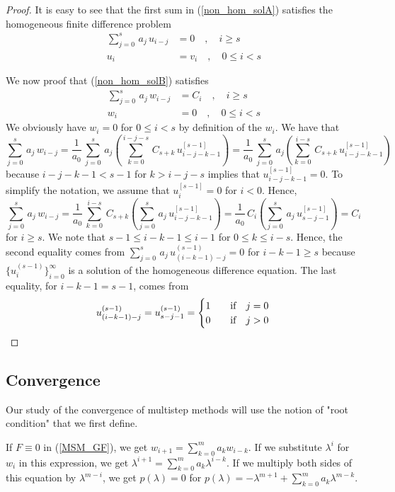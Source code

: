 \begin{proof}
It is easy to see that the first sum in (\ref{non_hom_solA}) satisfies
the homogeneous finite difference problem
\begin{align*}
\sum_{j=0}^s\,a_j\,u_{i-j} &= 0 \quad, \quad i \geq s \\
u_i &= v_i \quad, \quad 0 \leq i < s
\end{align*}

We now proof that (\ref{non_hom_solB}) satisfies
\begin{align*}
\sum_{j=0}^s\,a_j\,w_{i-j} &= C_i \quad, \quad i\geq s \\
w_i &= 0 \quad, \quad 0 \leq i < s
\end{align*}
We obviously have $w_i =0$ for $0 \leq i <s$ by definition of the
$w_i$.  We have that
\[
\sum_{j=0}^s\,a_j\,w_{i-j} = \frac{1}{a_0}\,
\sum_{j=0}^s\,a_j\left(\sum_{k=0}^{i-j-s}\,C_{s+k}\,u_{i-j-k-1}^{[s-1]}\right)
= \frac{1}{a_0}\,
\sum_{j=0}^s\,a_j\left(\sum_{k=0}^{i-s}\,C_{s+k}\,u_{i-j-k-1}^{[s-1]}\right)
\]
because $i-j-k-1 < s-1$ for $k>i-j-s$ implies that
$u_{i-j-k-1}^{[s-1]} = 0$.  To simplify the notation, we assume that
$u_i^{[s-1]} = 0$ for $i<0$.  Hence,
\[
\sum_{j=0}^s\,a_j\,w_{i-j} =
\frac{1}{a_0}\,\sum_{k=0}^{i-s}\,C_{s+k}
\left(\sum_{j=0}^s\,a_j\,u_{i-j-k-1}^{[s-1]}\right)
= \frac{1}{a_0}\,C_i\left(\sum_{j=0}^s\,a_j\,u_{s-j-1}^{[s-1]}\right) = C_i
\]
for $i\geq s$.   We note that
$s-1 \leq i-k-1 \leq i-1$ for $0\leq k \leq i-s$.  Hence, the second
equality comes from 
$\displaystyle \sum_{j=0}^s\,a_j\,u_{(i-k-1)-j}^{(s-1)} = 0$ 
for $i-k-1 \geq s$ because
$\{ u_i^{(s-1)} \}_{i=0}^\infty$ is a solution of the homogeneous
difference equation.  The last equality, for $i-k-1 = s-1$, comes from
\[
  u_{(i-k-1)-j}^{(s-1)} = u_{s-j-1}^{(s-1)}
= \begin{cases}
  1 & \quad \text{if} \quad j = 0 \\
  0 & \quad \text{if} \quad j > 0
\end{cases}  \qedhere
\]
\end{proof}

\subsection{Convergence}

Our study of the convergence of multistep methods will use the notion of
"root condition" that we first define.

If $F \equiv 0$ in (\ref{MSM_GF}), we get
$\displaystyle w_{i+1} = \sum_{k=0}^m a_k w_{i-k}$.
If we substitute $\lambda^i$ for $w_i$ in this expression, we get
$\displaystyle \lambda^{i+1} = \sum_{k=0}^m a_k \lambda^{i-k}$. 
If we multiply both sides of this equation by $\lambda^{m-i}$, we get 
$p(\lambda) = 0$ for
$\displaystyle p(\lambda) = - \lambda^{m+1} + \sum_{k=0}^m a_k \lambda^{m-k}$.

